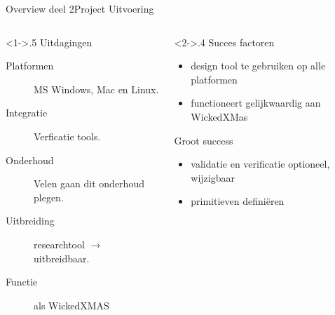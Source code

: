 \begin{frame}[label=challanges]{Overview deel 2}{Project Uitvoering}

    \begin{columns}[t]
        \begin{column}<1->{.5\textwidth}
	    Uitdagingen
	    \begin{description}
	        \item[Platformen] {\tiny MS Windows, Mac en Linux.}
	        \item[Integratie] {\tiny Verficatie tools.}
	        \item[Onderhoud] {\tiny Velen gaan dit onderhoud plegen.}
		\item[Uitbreiding] {\tiny researchtool $\rightarrow$ uitbreidbaar.}
		\item[Functie] {\tiny als WickedXMAS}
	    \end{description}


        \end{column}
        \begin{column}<2->{.4\textwidth}
	    Succes factoren
	    \begin{itemize}
	        \item {\tiny design tool te gebruiken op alle platformen}
	        \item {\tiny functioneert gelijkwaardig aan WickedXMas}
	    \end{itemize}
	    Groot success
	    \begin{itemize}
	        \item {\tiny validatie en verificatie optioneel, wijzigbaar}
	        \item {\tiny primitieven defini\"{e}ren}
	    \end{itemize}
        \end{column}

    \end{columns}


\end{frame}

